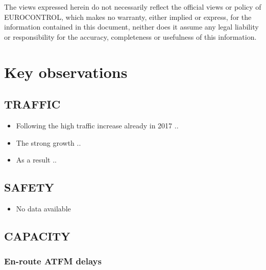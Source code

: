 \documentclass[]{article}
\providecommand{\tightlist}{%
  \setlength{\itemsep}{0pt}\setlength{\parskip}{0pt}}
\begin{document}
The views expressed herein do not necessarily reflect the official views or policy of EUROCONTROL, which makes no warranty, either implied or express, for the information contained in this document, neither does it assume any legal liability or responsibility for the accuracy, completeness or usefulness of this information.

\newpage

\hypertarget{key-observations}{%
\section*{Key observations}\label{key-observations}}

\hypertarget{traffic}{%
\subsection*{TRAFFIC}\label{traffic}}

\begin{itemize}
\item
  Following the high traffic increase already in 2017 ..
\item
  The strong growth ..
\item
  As a result ..
\end{itemize}

\hypertarget{safety}{%
\subsection*{SAFETY}\label{safety}}

\begin{itemize}
\tightlist
\item
  No data available
\end{itemize}

\hypertarget{capacity}{%
\subsection*{CAPACITY}\label{capacity}}

\hypertarget{en-route-atfm-delays}{%
\subsubsection*{En-route ATFM delays}\label{en-route-atfm-delays}}
\end{document}
